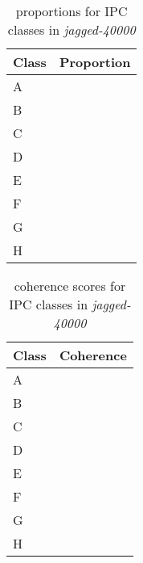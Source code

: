 	\begin{table}
		\centering
		\caption{proportions for IPC classes in \emph{jagged-40000}}
		\begin{tabular}{| l | c |}
			\hline
			\textbf{Class} & \textbf{Proportion} \\ 
					\hline
			A &  \\
					\hline
			B &  \\
					\hline
			C &  \\
					\hline
			D &  \\
					\hline
			E &  \\
					\hline
			F &  \\
			\hline
			G &  \\
					\hline
			H &  \\
					\hline
		\end{tabular}
	\end{table}
	\begin{table}
		\centering
		\caption{coherence scores for IPC classes in \emph{jagged-40000}}		
		\begin{tabular}{| l | c |}
			\hline
			\textbf{Class} & \textbf{Coherence} \\ 
					\hline
			A &  \\
					\hline
			B &  \\
					\hline
			C &  \\
					\hline
			D &  \\
					\hline
			E &  \\
					\hline
			F &  \\
			\hline
			G &  \\
					\hline
			H &  \\
					\hline
		\end{tabular}
	\end{table}




  
